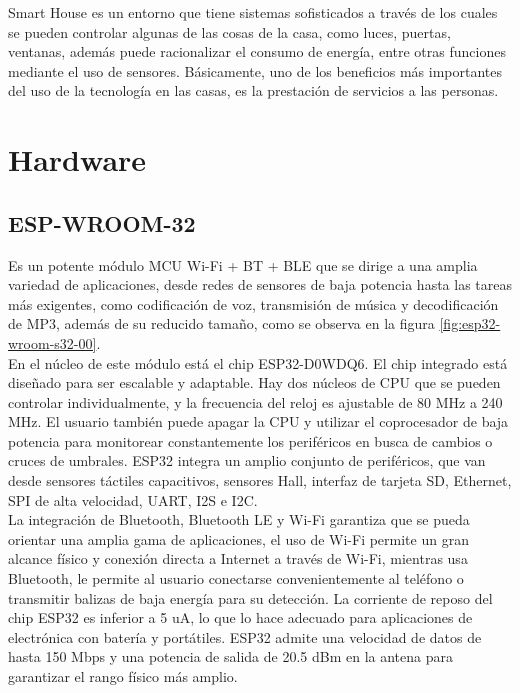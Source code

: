 Smart House es un entorno que tiene sistemas sofisticados a través de los cuales se pueden controlar algunas de las cosas de la casa, como luces, puertas, ventanas, además  puede racionalizar el consumo de energía, entre otras funciones mediante el uso de sensores. Básicamente, uno de los beneficios más importantes del uso de la tecnología en las casas, es la prestación de servicios a las personas.\cite{Howedi2016} 

\section{Hardware}

\subsection{ESP-WROOM-32}

Es un potente módulo MCU Wi-Fi + BT + BLE que se dirige a una amplia variedad de aplicaciones, desde redes de sensores de baja potencia hasta las tareas más exigentes, como codificación de voz, transmisión de música y decodificación de MP3, además de su reducido tamaño, como se observa en la figura \ref{fig:esp32-wroom-s32-00}.\\

En el núcleo de este módulo está el chip ESP32-D0WDQ6. El chip integrado está diseñado para ser escalable y adaptable. Hay dos núcleos de CPU que se pueden controlar individualmente, y la frecuencia del reloj es ajustable de 80 MHz a 240 MHz. El usuario también puede apagar la CPU y utilizar el coprocesador de baja potencia para monitorear constantemente los periféricos en busca de cambios o cruces de umbrales. ESP32 integra un amplio conjunto de periféricos, que van desde sensores táctiles capacitivos, sensores Hall, interfaz de tarjeta SD, Ethernet, SPI de alta velocidad, UART, I2S e I2C.\\

La integración de Bluetooth, Bluetooth LE y Wi-Fi garantiza que se pueda orientar una amplia gama de aplicaciones, el uso de Wi-Fi permite un gran alcance físico y conexión directa a Internet a través de Wi-Fi, mientras usa Bluetooth, le permite al usuario conectarse convenientemente al teléfono o transmitir balizas de baja energía para su detección. La corriente de reposo del chip ESP32 es inferior a 5 uA, lo que lo hace adecuado para aplicaciones de electrónica con batería y portátiles. ESP32 admite una velocidad de datos de hasta 150 Mbps y una potencia de salida de 20.5 dBm en la antena para garantizar el rango físico más amplio.\\

